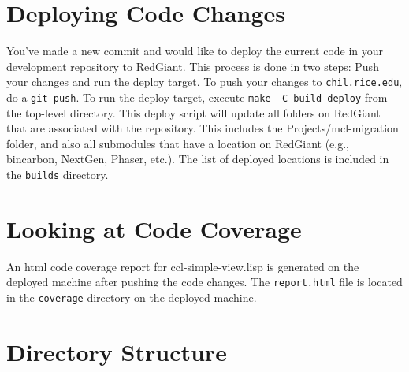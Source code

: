 \documentclass[12pt]{article} %
\newcommand{\code}[1]{\texttt{#1}}
\newcommand{\filesys}[1]{\texttt{#1}}
\begin{document}
\section{Deploying Code Changes}

You've made a new commit and would like to deploy the current code in your development repository to RedGiant.
This process is done in two steps: Push your changes and run the deploy target.
To push your changes to \filesys{chil.rice.edu}, do a \code{git push}.
To run the deploy target, execute \code{make -C build deploy} from the top-level directory.
This deploy script will update all folders on RedGiant that are associated with the repository.
This includes the Projects/mcl-migration folder, and also all submodules that have a location on RedGiant (e.g., bincarbon, NextGen, Phaser, etc.).
The list of deployed locations is included in the \filesys{builds} directory.

\section{Looking at Code Coverage}

An html code coverage report for ccl-simple-view.lisp is generated on the deployed machine after pushing the code changes.
The \filesys{report.html} file is located in the \filesys{coverage} directory on the deployed machine.

\section{Directory Structure} %
\end{document}
